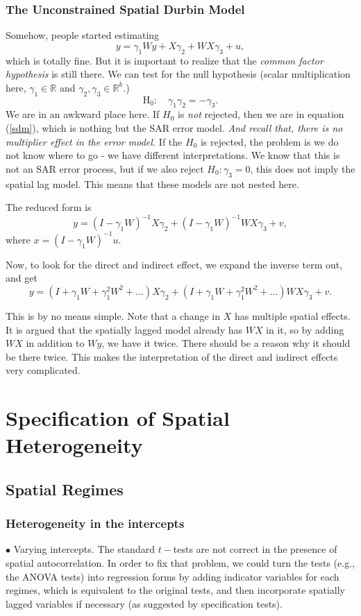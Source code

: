 \documentclass[11pt,a4paper]{amsart}
\theoremstyle{plain}
\theoremstyle{definition}
\begin{document}
\subsubsection{The Unconstrained Spatial Durbin Model}\hfill\par 
Somehow, people started estimating
\[	y = \gamma_{1}Wy + X\gamma_{2} + WX\gamma_{3} + u,	\]
which is totally fine. But it is important to realize that the \textit{common factor hypothesis} is still there. We can test for the null hypothesis (scalar multiplication here, $\gamma_{1} \in \mathbb{R}$ and $\gamma_{2}, \gamma_{3} \in \mathbb{R}^{k}$.)
\[	\operatorname{H_{0}}:\quad \gamma_{1} \gamma_{2} = -\gamma_{3}.	\]
We are in an awkward place here. If $H_{0}$ is \textit{not} rejected, then we are in equation (\ref{sdm}), which is nothing but the SAR error model. \emph{And recall that, there is no multiplier effect in the error model.} If the $H_{0}$ is rejected, the problem is we do not know where to go - we have different interpretations. We know that this is not an SAR error process, but if we also reject $H_{0}: \gamma_{3} = 0$, this does not imply the spatial lag model. This means that these models are not nested here. 

The reduced form is 
\[	y = (I-\gamma_{1}W)^{-1}X\gamma_{2} + (I-\gamma_{1}W)^{-1}WX\gamma_{3} + v,	\]
where $x = (I-\gamma_{1}W)^{-1}u$.

Now, to look for the direct and indirect effect, we expand the inverse term out, and get
\[	y = (I + \gamma_{1}W + \gamma_{1}^{2}W^{2} + \dots )X\gamma_{2} + (I+\gamma_{1}W + \gamma_{1}^{2}W^{2} + \dots )WX\gamma_{3} + v.	\]

This is by no means simple. Note that a change in $X$ has multiple spatial effects. It is argued that the spatially lagged model already has $WX$ in it, so by adding $WX$ in addition to $Wy$, we have it twice. There should be a reason why it should be there twice. This makes the interpretation of the direct and indirect effects very complicated. 

\section{Specification of Spatial Heterogeneity}\hfill\par 
\subsection{Spatial Regimes}\hfill\par 
\subsubsection{Heterogeneity in the intercepts}
$\bullet$ Varying intercepts. The standard $t-$tests are not correct in the presence of spatial autocorrelation. In order to fix that problem, we could turn the tests (e.g., the ANOVA tests) into regression forms by adding indicator variables for each regimes, which is equivalent to the original tests, and then incorporate spatially lagged variables if necessary (as suggested by specification tests). 
\end{document}
